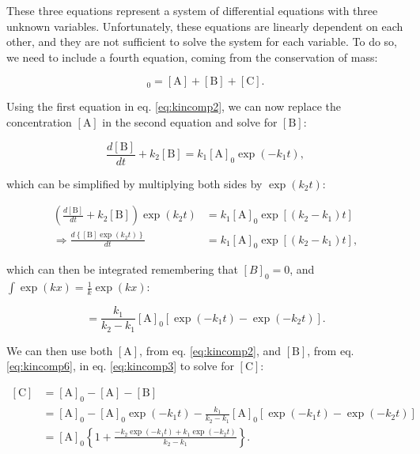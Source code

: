 \documentclass[
  9pt,
]{extbook}
\theoremstyle{definition}
\theoremstyle{definition}
\theoremstyle{definition}
\theoremstyle{remark}
\begin{document}
These three equations represent a system of differential equations with three unknown variables. Unfortunately, these equations are linearly dependent on each other, and they are not sufficient to solve the system for each variable. To do so, we need to include a fourth equation, coming from the conservation of mass:

\begin{equation}
[\mathrm{A}]_0=[\mathrm{A}]+[\mathrm{B}]+[\mathrm{C}].
\label{eq:kincomp3}
\end{equation}

Using the first equation in eq. \eqref{eq:kincomp2}, we can now replace the concentration \([\mathrm{A}]\) in the second equation and solve for \([\mathrm{B}]\):

\begin{equation}
\frac{d[\mathrm{B}]}{dt}+k_2 [\mathrm{B}]=k_1 [\mathrm{A}]_0 \exp(-k_1 t),
\label{eq:kincomp4}
\end{equation}

which can be simplified by multiplying both sides by \(\exp (k_2t)\):

\begin{equation}
\begin{aligned}
\left( \frac{d[\mathrm{B}]}{dt}+k_2 [\mathrm{B}] \right) \exp (k_2t) &= k_1 [\mathrm{A}]_0 \exp[(k_2-k_1) t] \\
\Rightarrow \frac{d\left\{[\mathrm{B}]\exp (k_2t)\right\}}{dt} &= k_1 [\mathrm{A}]_0 \exp[(k_2-k_1) t],
\end{aligned}
\label{eq:kincomp5}
\end{equation}

which can then be integrated remembering that \([B]_0=0\), and \(\int \exp(kx)=\frac{1}{k}\exp(kx)\):

\begin{equation}
[\mathrm{B}] = \frac{k_1}{k_2-k_1} [\mathrm{A}]_0 [\exp(-k_1t)-\exp(-k_2t)].
\label{eq:kincomp6}
\end{equation}

We can then use both \([\mathrm{A}]\), from eq. \eqref{eq:kincomp2}, and \([\mathrm{B}]\), from eq. \eqref{eq:kincomp6}, in eq. \eqref{eq:kincomp3} to solve for \([\mathrm{C}]\):

\begin{equation}
\begin{aligned}
\left[\mathrm{C}\right] &= [\mathrm{A}]_0-[\mathrm{A}]-[\mathrm{B}] \\
&= [\mathrm{A}]_0-[\mathrm{A}]_0 \exp(-k_1 t)-\frac{k_1}{k_2-k_1} [\mathrm{A}]_0 [\exp(-k_1t)-\exp(-k_2t)] \\
&= [\mathrm{A}]_0\left\{1+\frac{-k_2 \exp(-k_1t)+ k_1 \exp(-k_2t)}{k_2-k_1} \right\}.
\end{aligned}
\label{eq:kincomp7}
\end{equation}
\end{document}
